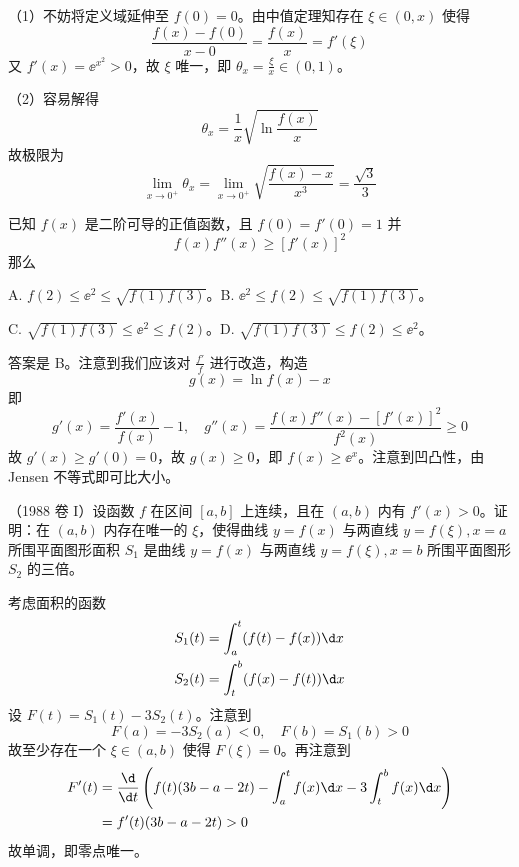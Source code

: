 \begin{solution}
	（1）不妨将定义域延伸至 $f(0) = 0$。由中值定理知存在 $\xi \in (0, x)$ 使得
	\[ \frac{f(x) - f(0)}{x - 0} = \frac{f(x)}{x} = f'(\xi) \]
	又 $f'(x) = \ee^{x^2} > 0$，故 $\xi$ 唯一，即 $\theta_x = \frac{\xi}{x} \in (0, 1)$。

	（2）容易解得
	\[ \theta_x = \frac{1}{x} \sqrt{\ln \frac{f(x)}{x}} \]
	故极限为
	\[ \lim_{x \to 0^+} \theta_x = \lim_{x \to 0^+} \sqrt{\frac{f(x) - x}{x^3}} = \frac{\sqrt{3}}{3} \]
\end{solution}

\begin{problem}[000026]
已知 $f(x)$ 是二阶可导的正值函数，且 $f(0) = f'(0) = 1$ 并
\[ f(x) f''(x) \geqslant [f'(x)]^2 \]
那么

A. $f(2) \leqslant \ee^2 \leqslant \sqrt{f(1)f(3)}$。B. $\ee^2 \leqslant f(2) \leqslant \sqrt{f(1)f(3)}$。

C. $\sqrt{f(1)f(3)} \leqslant \ee^2 \leqslant f(2)$。D. $\sqrt{f(1)f(3)} \leqslant f(2) \leqslant \ee^2$。
\end{problem}

\begin{solution}
	答案是 B。注意到我们应该对 $\frac{f'}{f}$ 进行改造，构造
	\[ g(x) = \ln f(x) - x \]
	即
	\[ g'(x) = \frac{f'(x)}{f(x)} - 1, \quad g''(x) = \frac{f(x) f''(x) - [f'(x)]^2}{f^2(x)} \geqslant 0 \]
	故 $g'(x) \geqslant g'(0) = 0$，故 $g(x) \geqslant 0$，即 $f(x) \geqslant \ee^x$。注意到凹凸性，由 Jensen 不等式即可比大小。
\end{solution}

\begin{problem}[000032]
（1988 卷 I）设函数 $f$ 在区间 $[a, b]$ 上连续，且在 $(a, b)$ 内有 $f'(x) > 0$。证明：在 $(a, b)$ 内存在唯一的 $\xi$，使得曲线 $y = f(x)$ 与两直线 $y = f(\xi), x = a$ 所围平面图形面积 $S_1$ 是曲线 $y = f(x)$ 与两直线 $y = f(\xi), x = b$ 所围平面图形 $S_2$ 的三倍。
\end{problem}

\begin{solution}
	考虑面积的函数
	\[  \begin{aligned}
			S_1(t) & = \int_{a}^{t} (f(t) - f(x)) \d x \\
			S_2(t) & = \int_{t}^{b} (f(x) - f(t)) \d x
		\end{aligned} \]
	设 $F(t) = S_1(t) - 3S_2(t)$。注意到
	\[ F(a) = -3S_2(a) < 0, \quad F(b) = S_1(b) > 0 \]
	故至少存在一个 $\xi \in (a, b)$ 使得 $F(\xi) = 0$。再注意到
	\[ \begin{aligned}
			F'(t)
			 & = \frac{\d}{\d t}\left( f(t)(3b - a - 2t) - \int_{a}^{t} f(x) \d x - 3 \int_{t}^{b} f(x) \d x \right) \\
			 & = f'(t) (3b - a - 2t) > 0
		\end{aligned} \]
	故单调，即零点唯一。
\end{solution}

